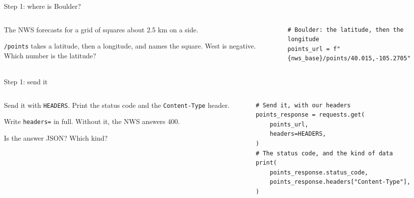 \documentclass[9pt,aspectratio=169]{beamer}
\begin{document}
\begin{frame}[fragile]{Step 1: where is Boulder?}
    \begin{columns}[T]
        \begin{column}{0.37\textwidth}
            The NWS forecasts for a grid of squares about 2.5 km on a side.

            \medskip
            \texttt{/points} takes a latitude, then a longitude, and names the square. West is negative. Which number is the latitude?
        \end{column}
        \begin{column}{0.6\textwidth}
\begin{lstlisting}
# Boulder: the latitude, then the longitude
points_url = f"{nws_base}/points/40.015,-105.2705"
\end{lstlisting}
        \end{column}
    \end{columns}
\end{frame}

\begin{frame}[fragile]{Step 1: send it}
    \begin{columns}[T]
        \begin{column}{0.37\textwidth}
            Send it with \texttt{HEADERS}. Print the status code and the \texttt{Content-Type} header.

            \medskip
            Write \texttt{headers=} in full. Without it, the NWS answers 400.

            \medskip
            Is the answer JSON? Which kind?
        \end{column}
        \begin{column}{0.6\textwidth}
\begin{lstlisting}
# Send it, with our headers
points_response = requests.get(
    points_url,
    headers=HEADERS,
)
# The status code, and the kind of data
print(
    points_response.status_code,
    points_response.headers["Content-Type"],
)
\end{lstlisting}
        \end{column}
    \end{columns}
\end{frame}
\end{document}
